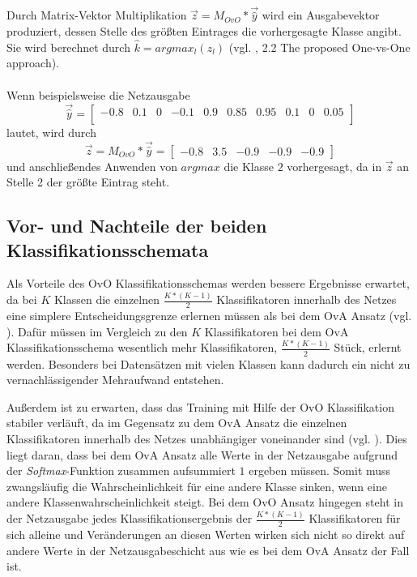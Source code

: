 Durch Matrix-Vektor Multiplikation $\overrightarrow{z} = M_{OvO} * \overrightarrow{\widehat{y}}$ wird ein Ausgabevektor produziert, dessen Stelle des größten Eintrages die vorhergesagte Klasse angibt.\\
Sie wird berechnet durch $\widehat{k} = argmax_l (z_l)$ (vgl. \cite{pawaraPaper}, 2.2 The proposed One-vs-One approach).\\\\
Wenn beispielsweise die Netzausgabe
\[\overrightarrow{\widehat{y}} = \begin{bmatrix}
-0.8 & 0.1 & 0 & -0.1 & 0.9 & 0.85 & 0.95 & 0.1 & 0 & 0.05\\
\end{bmatrix}
\]
lautet, wird durch
\[\overrightarrow{z} = M_{OvO} * \overrightarrow{\widehat{y}} = \begin{bmatrix}
-0.8 & 3.5 & -0.9 & -0.9 & -0.9
\end{bmatrix}\]
und anschließendes Anwenden von $argmax$ die Klasse $2$ vorhergesagt, da in $\overrightarrow{z}$ an Stelle 2 der größte Eintrag steht.

\subsection{Vor- und Nachteile der beiden Klassifikationsschemata}
Als Vorteile des OvO Klassifikationsschemas werden bessere Ergebnisse erwartet, da bei $K$ Klassen die einzelnen $\frac{K*(K-1)}{2}$ Klassifikatoren innerhalb des Netzes eine simplere Entscheidungsgrenze erlernen müssen als bei dem OvA Ansatz (vgl. \cite{pawaraPaper}).
Dafür müssen im Vergleich zu den $K$ Klassifikatoren bei dem OvA Klassifikationsschema wesentlich mehr Klassifikatoren, $\frac{K*(K-1)}{2}$ Stück, erlernt werden. Besonders bei Datensätzen mit vielen Klassen kann dadurch ein nicht zu vernachlässigender Mehraufwand entstehen.

Außerdem ist zu erwarten, dass das Training mit Hilfe der OvO Klassifikation stabiler verläuft, da im Gegensatz zu dem OvA Ansatz die einzelnen Klassifikatoren innerhalb des Netzes unabhängiger voneinander sind (vgl. \cite{pawaraPaper}). Dies liegt daran, dass bei dem OvA Ansatz alle Werte in der Netzausgabe aufgrund der \textit{Softmax}-Funktion zusammen aufsummiert $1$ ergeben müssen. Somit muss zwangsläufig die Wahrscheinlichkeit für eine andere Klasse sinken, wenn eine andere Klassenwahrscheinlichkeit steigt. Bei dem OvO Ansatz hingegen steht in der Netzausgabe jedes Klassifikationsergebnis der $\frac{K*(K-1)}{2}$ Klassifikatoren für sich alleine und Veränderungen an diesen Werten wirken sich nicht so direkt auf andere Werte in der Netzausgabeschicht aus wie es bei dem OvA Ansatz der Fall ist.
\newpage
